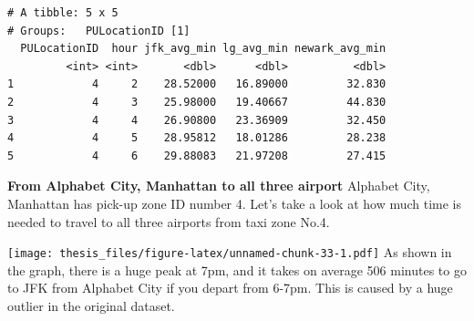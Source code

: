 \documentclass[12pt,twoside]{reedthesis}
\newenvironment{Shaded}{\begin{snugshade}}{\end{snugshade}}
\newcommand{\KeywordTok}[1]{\textcolor[rgb]{0.13,0.29,0.53}{\textbf{#1}}}
\newcommand{\DataTypeTok}[1]{\textcolor[rgb]{0.13,0.29,0.53}{#1}}
\newcommand{\DecValTok}[1]{\textcolor[rgb]{0.00,0.00,0.81}{#1}}
\newcommand{\StringTok}[1]{\textcolor[rgb]{0.31,0.60,0.02}{#1}}
\newcommand{\OperatorTok}[1]{\textcolor[rgb]{0.81,0.36,0.00}{\textbf{#1}}}
\newcommand{\NormalTok}[1]{#1}
\theoremstyle{definition}
\theoremstyle{definition}
\theoremstyle{definition}
\theoremstyle{remark}
\begin{document}
\begin{Shaded}
\end{Shaded}
\begin{verbatim}
# A tibble: 5 x 5
# Groups:   PULocationID [1]
  PULocationID  hour jfk_avg_min lg_avg_min newark_avg_min
         <int> <int>       <dbl>      <dbl>          <dbl>
1            4     2    28.52000   16.89000         32.830
2            4     3    25.98000   19.40667         44.830
3            4     4    26.90800   23.36909         32.450
4            4     5    28.95812   18.01286         28.238
5            4     6    29.88083   21.97208         27.415
\end{verbatim}
\textbf{From Alphabet City, Manhattan to all three airport} Alphabet
City, Manhattan has pick-up zone ID number 4. Let's take a look at how
much time is needed to travel to all three airports from taxi zone No.4.
\begin{Shaded}
\end{Shaded}
\begin{Shaded}
\end{Shaded}
\texttt{[image: thesis\_files/figure-latex/unnamed-chunk-33-1.pdf]} As
shown in the graph, there is a huge peak at 7pm, and it takes on average
506 minutes to go to JFK from Alphabet City if you depart from 6-7pm.
This is caused by a huge outlier in the original dataset.
\end{document}
